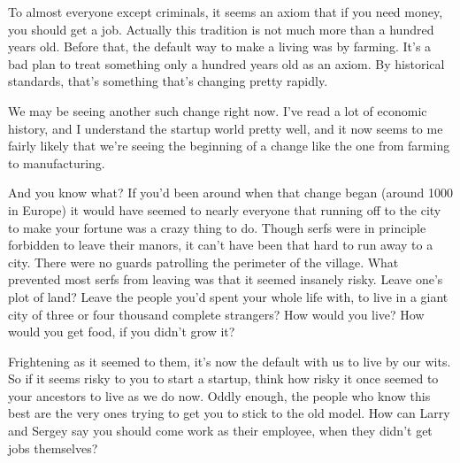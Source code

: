 To
                    almost everyone except criminals, it seems an axiom that if
                    you need money, you should get a job. Actually this
                    tradition is not much more than a hundred years old. Before
                    that, the default way to make a living was by farming. It's
                    a bad plan to treat something only a hundred years old as an
                    axiom. By historical standards, that's something that's
                    changing pretty rapidly.

We may be seeing another
                    such change right now. I've read a lot of economic history,
                    and I understand the startup world pretty well, and it now
                    seems to me fairly likely that we're seeing the beginning of
                    a change like the one from farming to manufacturing.

And
                    you know what? If you'd been around when that change began
                    (around 1000 in Europe) it would have seemed to nearly
                    everyone that running off to the city to make your fortune
                    was a crazy thing to do. Though serfs were in principle
                    forbidden to leave their manors, it can't have been that
                    hard to run away to a city. There were no guards patrolling
                    the perimeter of the village. What prevented most serfs from
                    leaving was that it seemed insanely risky. Leave one's plot
                    of land? Leave the people you'd spent your whole life with,
                    to live in a giant city of three or four thousand complete
                    strangers? How would you live? How would you get food, if
                    you didn't grow it?

Frightening as it seemed to
                    them, it's now the default with us to live by our wits. So
                    if it seems risky to you to start a startup, think how risky
                    it once seemed to your ancestors to live as we do now. Oddly
                    enough, the people who know this best are the very ones
                    trying to get you to stick to the old model. How can Larry
                    and Sergey say you should come work as their employee, when
                    they didn't get jobs themselves?

